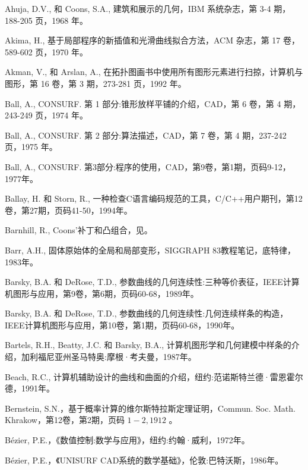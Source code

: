 \documentclass[../main.tex]{subfiles}
\begin{document}
\begin{BookBibliography}
 Ahuja, D.V., 和 Coons, S.A., 建筑和展示的几何，IBM 系统杂志，第 3-4 期，188-205 页，1968 年。

 Akima, H., 基于局部程序的新插值和光滑曲线拟合方法，ACM 杂志，第 17 卷，589-602 页，1970 年。

 Akman, V., 和 Arslan, A., 在拓扑图画书中使用所有图形元素进行扫掠，计算机与图形，第 16 卷，第 3 期，273-281 页，1992 年。

 Ball, A., CONSURF. 第 1 部分:锥形放样平铺的介绍，CAD，第 6 卷，第 4 期，243-249 页，1974 年。

 Ball, A., CONSURF. 第 2 部分:算法描述，CAD，第 7 卷，第 4 期，237-242 页，1975 年。

 Ball, A., CONSURF. 第3部分:程序的使用，CAD，第9卷，第1期，页码9-12，1977年。

 Ballay, H. 和 Storn, R., 一种检查C语言编码规范的工具，C/C++用户期刊，第12卷，第27期，页码41-50，1994年。

 Barnhill, R., Coons'补丁和凸组合，见\cite{Pieg93}。

 Barr, A.H., 固体原始体的全局和局部变形，SIGGRAPH 83教程笔记，底特律，1983年。

 Barsky, B.A. 和 DeRose, T.D., 参数曲线的几何连续性:三种等价表征，IEEE计算机图形与应用，第9卷，第6期，页码60-68，1989年。

 Barsky, B.A. 和 DeRose, T.D., 参数曲线的几何连续性:几何连续样条的构造，IEEE计算机图形与应用，第10卷，第1期，页码60-68，1990年。

 Bartels, R.H., Beatty, J.C. 和 Barsky, B.A., 计算机图形学和几何建模中样条的介绍，加利福尼亚州圣马特奥:摩根·考夫曼，1987年。

 Beach, R.C., 计算机辅助设计的曲线和曲面的介绍，纽约:范诺斯特兰德·雷恩霍尔德，1991年。

 Bernstein, S.N.，基于概率计算的维尔斯特拉斯定理证明，Commun. Soc. Math. Khrakow，第12卷，第2期，页码 \(1 - 2,{1912}\) 。

 Bézier, P.E.，《数值控制:数学与应用》，纽约:约翰·威利，1972年。

 Bézier, P.E.，《UNISURF CAD系统的数学基础》，伦敦:巴特沃斯，1986年。


\end{BookBibliography}
\end{document}
